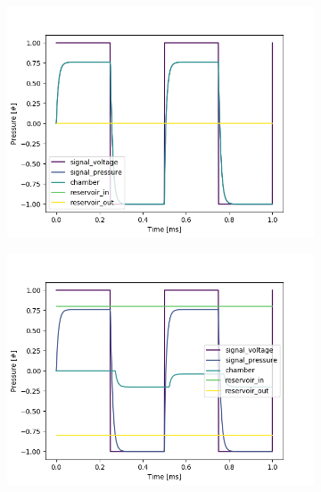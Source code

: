 \documentclass[fontsize=12pt, a4paper]{scrartcl}
\begin{document}
\begin{figure}[H]
    \centering
    \begin{subfigure}[H]{0.48\textwidth}
        \includegraphics[width=\textwidth, valign=t]{bilder/backpressure/backpressure_free.png}
        \label{fig:gegendruck_ohne}
    \end{subfigure}
    \begin{subfigure}[H]{0.48\textwidth}
        \includegraphics[width=\textwidth, valign=t]{bilder/backpressure/backpressure_example.png}
        \label{fig:gegendruck_mit}
    \end{subfigure}
    \begin{subfigure}[H]{0.48\textwidth}

\end{subfigure}
\end{figure}
\end{document}
